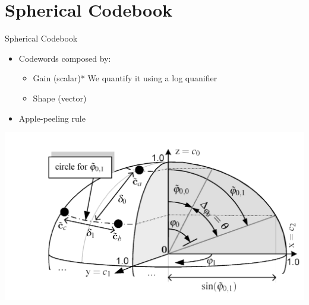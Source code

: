\documentclass[10pt]{beamer}
\begin{document}

\begingroup
{}
\section{Spherical Codebook}
\endgroup

\begin{frame}{Spherical Codebook}
  \begin{itemize}
    \item Codewords composed by:
    \begin{itemize}
      \item Gain (scalar)* \hspace{60pt}\footnotesize *We quantify it using a log quanifier
      \item Shape (vector)
    \end{itemize}
    \item Apple-peeling rule
    \end{itemize}
  \includegraphics[width=0.9\linewidth]{./img/Centroides.png}

\end{frame}
\end{document}
